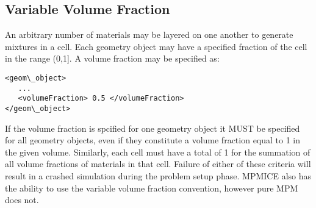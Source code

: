 \subsection{Variable Volume Fraction}
An arbitrary number of materials may be layered on one another to generate mixtures in a cell.  Each geometry object may have a specified fraction of the cell in the range (0,1].  A volume fraction may be specified as:
%
\begin{Verbatim}
<geom\_object>
   ...
   <volumeFraction> 0.5 </volumeFraction>
</geom\_object>
\end{Verbatim}
%
If the volume fraction is spcified for one geometry object it MUST be specified for all geometry objects, even if they constitute a volume fraction equal to 1 in the given volume.  Similarly, each cell must have a total of 1 for the summation of all volume fractions of materials in that cell.  Failure of either of these criteria will result in a crashed simulation during the problem setup phase.  MPMICE also has the ability to use the variable volume fraction convention, however pure MPM does not.
%
